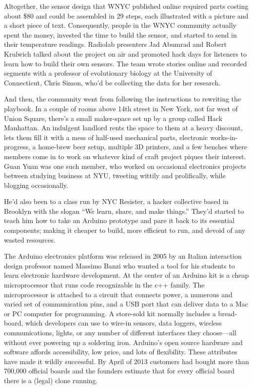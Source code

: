 Altogether, the sensor design that WNYC published online required parts
costing about \$80 and could be assembled in 29 steps, each illustrated with
a picture and a short piece of text. Consequently, people in the WNYC
community actually spent the money, invested the time to build the sensor,
and started to send in their temperature readings. Radiolab presenters
Jad Abumrad and Robert Krulwich talked about the project on air and
promoted hack days for listeners to learn how to build their own sensors.
The team wrote stories online and recorded segments with a professor of
evolutionary biology at the University of Connecticut, Chris Simon, who'd
be collecting the data for her research.

And then, the community went from following the instructions to rewriting
the playbook. In a couple of rooms above 14th street in New York, not
far west of Union Square, there's a small maker-space set up by a group
called Hack Manhattan. An indulgent landlord rents the space to them at a
heavy discount, lets them fill it with a mess of half-used mechanical parts,
electronic works-in-progress, a home-brew beer setup, multiple 3D printers,
and a few benches where members come in to work on whatever kind
of craft project piques their interest. Guan Yuan was one such member,
who worked on occasional electronics projects between studying business
at NYU, tweeting wittily and prolifically, while blogging occasionally.

He'd also been to a class run by NYC Resister, a hacker collective based
in Brooklyn with the slogan ``We learn, share, and make things.'' They'd
started to teach him how to take an Arduino prototype and pare it back to
its essential components; making it cheaper to build, more efficient to run,
and devoid of any wasted resources.

The Arduino electronics platform was released in 2005 by an Italian interaction
design professor named Massimo Banzi who wanted a tool for his
students to learn electronic hardware development. At the center of an
Arduino kit is a cheap microprocessor that runs code recognizable in the
c++ family. The microprocessor is attached to a circuit that connects power,
a numerous and varied set of communication pins, and a USB port that
can deliver data to a Mac or PC computer for programming. A store-sold
kit normally includes a bread-board, which developers can use to wire-in
sensors, data loggers, wireless communications, lights, or any number of
different interfaces they choose—all without ever powering up a soldering
iron. Arduino's open source hardware and software affords accessibility,
low price, and lots of flexibility. These attributes have made it wildly successful.
By April of 2013 customers had bought more than 700,000 official
boards and the founders estimate that for every official board there is a
(legal) clone running.


